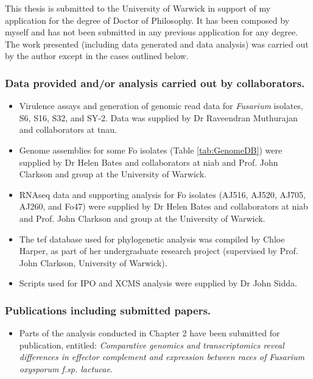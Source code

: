 This thesis is submitted to the University of Warwick in support of my application for the degree of Doctor of Philosophy. It has been composed by myself and has not been submitted in any previous application for any degree. The work presented (including data generated and data analysis) was carried out by the author except in the cases outlined below. 
\noindent
\subsubsection{Data provided and/or analysis carried out by collaborators.}
\begin{itemize}
    \item Virulence assays and generation of genomic read data for \textit{Fusarium} isolates, S6, S16, S32, and SY-2. Data was supplied by Dr Raveendran Muthurajan and collaborators at \acl{tnau}. 
    \item Genome assemblies for some \acl{Fo} isolates (Table \ref{tab:GenomeDB}) were supplied by Dr Helen Bates and collaborators at \acl{niab} and Prof. John Clarkson and group at the University of Warwick. 
    \item RNAseq data and supporting analysis for \acl{Fo} isolates (AJ516, AJ520, AJ705, AJ260, and Fo47) were supplied by Dr Helen Bates and collaborators at \acl{niab} and Prof. John Clarkson and group at the University of Warwick. 
    \item The \acl{tef} database used for phylogenetic analysis was compiled by Chloe Harper, as part of her undergraduate research project (supervised by Prof. John Clarkson, University of Warwick).
    \item Scripts used for IPO and XCMS analysis were supplied by Dr John Sidda.
\end{itemize} 

\subsubsection{Publications including submitted papers.}
\begin{itemize}
    \item Parts of the analysis conducted in Chapter 2 have been submitted for publication, entitled: \textit{Comparative genomics and transcriptomics reveal differences in effector complement and expression between races of Fusarium oxysporum f.sp. lactucae}. 
\end{itemize}
